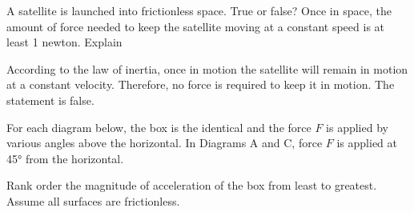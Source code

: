 \documentclass[answers]{exam}
\begin{document}
\begin{questions}
\question 
A satellite is launched into frictionless space. True or false? Once in space, the amount of force needed to keep the satellite moving at a constant speed is at least 1 newton. Explain

\ifprintanswers
\else
\fillwithlines{2cm}
\fi

\begin{solution}
    According to the law of inertia, once in motion the satellite will remain in motion at a constant velocity. Therefore, no force is required to keep it in motion. The statement is false. 
\end{solution}

\question
For each diagram below, the box is the identical and the force $F$ is applied by various angles above the horizontal. In Diagrams A and C, force $F$ is applied at \ang{45} from the horizontal.

\begin{center}
\hspace{1cm}
\hspace{1cm}
\end{center}

Rank order the magnitude of acceleration of the box from least to greatest. Assume all surfaces are frictionless.


\end{questions}
\end{document}
